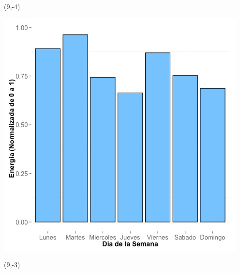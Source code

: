 \documentclass{article}\usepackage[]{graphicx}\usepackage[]{color}
\newenvironment{knitrout}{}{} %
\begin{document}
 \begin{textblock}{1}(9,-4)
\begin{minipage}{20em}
\begingroup

\endgroup
\end{minipage}
\end{textblock}


\begin{knitrout}
\color{fgcolor}
\includegraphics[scale=0.65]{figure/A10_day_of_week_plot} 
\end{knitrout}


 \begin{textblock}{1}(9,-3)
\begin{minipage}{20em}
\begingroup

\endgroup
\end{minipage}
\end{textblock}
\end{document}
